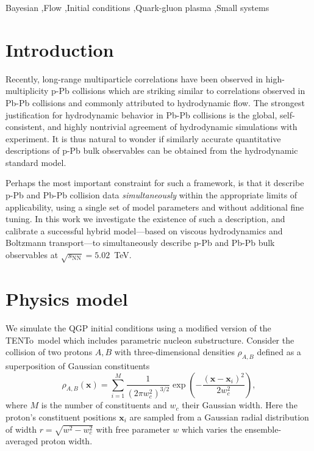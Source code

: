 \documentclass[3p,times,procedia]{elsarticle}
\newcommand{\trento}{T\raisebox{-0.3ex}{R}ENTo}
\newcommand{\sqrts}{\sqrt{s_\mathrm{NN}}}
\begin{document}
\begin{frontmatter}
\begin{keyword}
  Bayesian \sep Flow \sep Initial conditions \sep Quark-gluon plasma \sep Small systems


\end{keyword}

\end{frontmatter}


\section{Introduction}

Recently, long-range multiparticle correlations have been observed in high-multiplicity p-Pb collisions which are striking similar to correlations observed in Pb-Pb collisions and commonly attributed to hydrodynamic flow.
The strongest justification for hydrodynamic behavior in Pb-Pb collisions is the global, self-consistent, and highly nontrivial agreement of hydrodynamic simulations with experiment.
It is thus natural to wonder if similarly accurate quantitative descriptions of p-Pb bulk observables can be obtained from the hydrodynamic standard model.

Perhaps the most important constraint for such a framework, is that it describe p-Pb and Pb-Pb collision data \emph{simultaneously} within the appropriate limits of applicability, using a single set of model parameters and without additional fine tuning.
In this work we investigate the existence of such a description, and calibrate a successful hybrid model---based on viscous hydrodynamics and Boltzmann transport---to simultaneously describe p-Pb and Pb-Pb bulk observables at $\sqrts=5.02$~TeV.

\section{Physics model}

We simulate the QGP initial conditions using a modified version of the \trento\ model \cite{?} which includes parametric nucleon substructure.
Consider the collision of two protons $A, B$ with three-dimensional densities $\rho_{A,B}$ defined as a superposition of Gaussian constituents
\begin{equation}
  \label{density}
  \rho_{A,B}(\textbf{x}) = \sum\limits_{i=1}^{M} \frac{1}{(2 \pi w_c^2)^{3/2}} \exp\left(-\frac{(\textbf{x}-\textbf{x}_i)^2}{2 w_c^2}\right),
\end{equation}
where $M$ is the number of constituents and $w_c$ their Gaussian width.
Here the proton's constituent positions $\textbf{x}_i$ are sampled from a Gaussian radial distribution of width $r=\sqrt{w^2 - w_c^2}$ with free parameter $w$ which varies the ensemble-averaged proton width.
\end{document}
